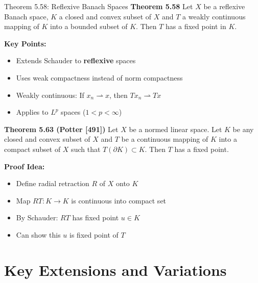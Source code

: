 \documentclass[aspectratio=169,10pt]{beamer}
\begin{document}
\begin{frame}[allowframebreaks]{Theorem 5.58: Reflexive Banach Spaces}
    \textbf{Theorem 5.58} Let $X$ be a reflexive Banach space, $K$ a closed and convex subset of $X$ and $T$ a weakly continuous mapping of $K$ into a bounded subset of $K$. Then $T$ has a fixed point in $K$.

    \vspace{0.3cm}
    \textbf{Key Points:}
    \begin{itemize}
        \item Extends Schauder to \textbf{reflexive} spaces
        \item Uses weak compactness instead of norm compactness
        \item Weakly continuous: If $x_n \rightharpoonup x$, then $Tx_n \rightharpoonup Tx$
        \item Applies to $L^p$ spaces ($1 < p < \infty$)
    \end{itemize}

    \framebreak

    \textbf{Theorem 5.63 (Potter [491])} Let $X$ be a normed linear space. Let $K$ be any closed and convex subset of $X$ and $T$ be a continuous mapping of $K$ into a compact subset of $X$ such that $T(\partial K) \subset K$. Then $T$ has a fixed point.

    \vspace{0.3cm}
    \textbf{Proof Idea:}
    \begin{itemize}
        \item Define radial retraction $R$ of $X$ onto $K$
        \item Map $RT: K \to K$ is continuous into compact set
        \item By Schauder: $RT$ has fixed point $u \in K$
        \item Can show this $u$ is fixed point of $T$
    \end{itemize}
\end{frame}

\section{Key Extensions and Variations}
\end{document}
